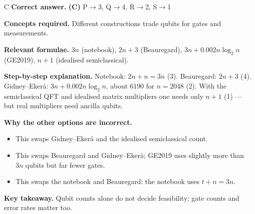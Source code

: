 \documentclass[11pt,a4paper]{article}
\newcommand{\qsep}{\par\vspace{2pt}{\color{black!15}\hrule}\vspace{4pt}}
\begin{document}
\begin{solbox}{C}
\textbf{\color{brand}Correct answer.} \textcolor{okgreen}{\textbf{(C)}} P$\to$3, Q$\to$4, R$\to$2, S$\to$1

\textbf{\color{brand}Concepts required.} Different constructions trade qubits for gates and measurements.

\textbf{\color{brand}Relevant formulae.} $3n$ (notebook), $2n + 3$ (Beauregard), $3n + 0.002n\log_2n$ (GE2019), $n + 1$ (idealised semiclassical).

\textbf{\color{brand}Step-by-step explanation.} Notebook: $2n + n = 3n$ (3). Beauregard: $2n + 3$ (4). Gidney--Ekerå: $3n + 0.002n\log_2 n$, about $6190$ for $n = 2048$ (2). With the semiclassical QFT and
idealised matrix multipliers one needs only $n + 1$ (1) --- but real multipliers need ancilla qubits.

\textbf{\color{brand}Why the other options are incorrect.}
\begin{itemize}[leftmargin=2.4em, itemsep=1pt, topsep=2pt]
\item[\textbf{(A)}] This swaps Gidney--Ekerå and the idealised semiclassical count.
\item[\textbf{(B)}] This swaps Beauregard and Gidney--Ekerå; GE2019 uses slightly more than $3n$ qubits but far fewer gates.
\item[\textbf{(D)}] This swaps the notebook and Beauregard: the notebook uses $t + n = 3n$.
\end{itemize}
\textbf{\color{brand}Key takeaway.} Qubit counts alone do not decide feasibility; gate counts and error rates matter too.
\end{solbox}
\qsep
\end{document}
